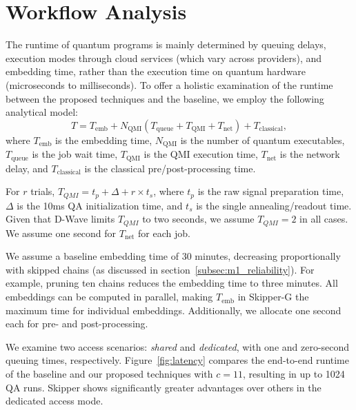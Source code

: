 \newpage
\section{Workflow Analysis} \label{sec:workflow}

The runtime of quantum programs is mainly determined by queuing delays, execution modes through cloud services (which vary across providers), and embedding time, rather than the execution time on quantum hardware (microseconds to milliseconds). 
To offer a holistic examination of the runtime between the proposed techniques and the baseline, we employ the following analytical model:
\begin{equation}
	T = T_{\text{emb}} + N_{\text{QMI}} \left({ T_{\text{queue}} + T_{\text{QMI}} + T_{\text{net}} }\right) + T_{\text{classical}},
	\label{eq:overall_runtime}
\end{equation}
where $T_{\text{emb}}$ is the embedding time, $N_{\text{QMI}}$ is the number of quantum executables, $T_{\text{queue}}$ is the job wait time, $T_{\text{QMI}}$ is the QMI execution time, $T_{\text{net}}$ is the network delay, and $T_{\text{classical}}$ is the classical pre/post-processing time.

For $r$ trials, $T_{QMI} = t_p + \Delta + r \times t_s$, where $t_p$ is the raw signal preparation time, $\Delta$ is the 10ms QA initialization time, and $t_s$ is the single annealing/readout time. 
Given that D-Wave limits $T_{QMI}$ to two seconds, we assume $T_{QMI} = 2$ in all cases. 
We assume one second for $T_{\text{net}}$ for each job.


We assume a baseline embedding time of 30 minutes, decreasing proportionally with skipped chains (as discussed in section~\ref{subsec:m1_reliability}). 
For example, pruning ten chains reduces the embedding time to three minutes. 
All embeddings can be computed in parallel, making $T_{\text{emb}}$ in Skipper-G the maximum time for individual embeddings. 
Additionally, we allocate one second each for pre- and post-processing.

We examine two access scenarios: \emph{shared} and \emph{dedicated}, with one and zero-second queuing times, respectively. 
Figure~\ref{fig:latency} compares the end-to-end runtime of the baseline and our proposed techniques with $c=11$, resulting in up to 1024 QA runs. 
Skipper shows significantly greater advantages over others in the dedicated access mode.

